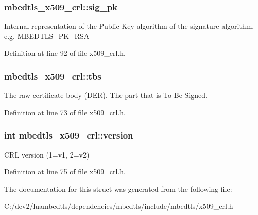 \hypertarget{structmbedtls__x509__crl_a8c94375266c53f6e73d0134dc978151a}{
\subsubsection[{sig\-\_\-pk}]{ mbedtls\-\_\-x509\-\_\-crl\-::sig\-\_\-pk}}\label{structmbedtls__x509__crl_a8c94375266c53f6e73d0134dc978151a}
Internal representation of the Public Key algorithm of the signature algorithm, e.\-g. M\-B\-E\-D\-T\-L\-S\-\_\-\-P\-K\-\_\-\-R\-S\-A 

Definition at line 92 of file x509\-\_\-crl.\-h.

\hypertarget{structmbedtls__x509__crl_ab8086dd1a2a3d82363cc91e1cdfb5850}{
\subsubsection[{tbs}]{ mbedtls\-\_\-x509\-\_\-crl\-::tbs}}\label{structmbedtls__x509__crl_ab8086dd1a2a3d82363cc91e1cdfb5850}
The raw certificate body (D\-E\-R). The part that is To Be Signed. 

Definition at line 73 of file x509\-\_\-crl.\-h.

\hypertarget{structmbedtls__x509__crl_aaf0d47225a63a5d9bf0e2e99d641e72d}{
\subsubsection[{version}]{\setlength{\rightskip}{0pt plus 5cm}int mbedtls\-\_\-x509\-\_\-crl\-::version}}\label{structmbedtls__x509__crl_aaf0d47225a63a5d9bf0e2e99d641e72d}
C\-R\-L version (1=v1, 2=v2) 

Definition at line 75 of file x509\-\_\-crl.\-h.



The documentation for this struct was generated from the following file\-:\begin{DoxyCompactItemize}
\item 
C\-:/dev2/luambedtls/dependencies/mbedtls/include/mbedtls/x509\-\_\-crl.\-h\end{DoxyCompactItemize}
